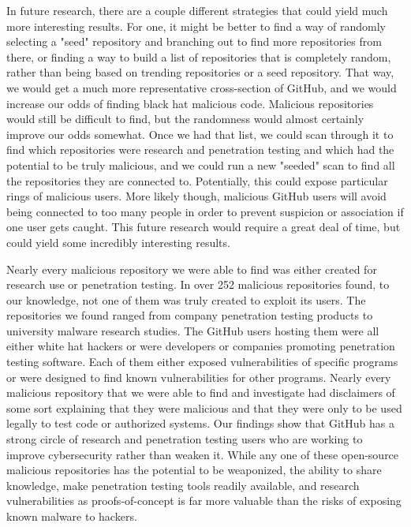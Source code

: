 \documentclass[]{acmart}
\begin{document}
In future research, there are a couple different strategies that could yield much more interesting results. For one, it might be better to find a way of randomly selecting a "seed" repository and branching out to find more repositories from there, or finding a way to build a list of repositories that is completely random, rather than being based on trending repositories or a seed repository. That way, we would get a much more representative cross-section of GitHub, and we would increase our odds of finding black hat malicious code. Malicious repositories would still be difficult to find, but the randomness would almost certainly improve our odds somewhat. Once we had that list, we could scan through it to find which repositories were research and penetration testing and which had the potential to be truly malicious, and we could run a new "seeded" scan to find all the repositories they are connected to. Potentially, this could expose particular rings of malicious users. More likely though, malicious GitHub users will avoid being connected to too many people in order to prevent suspicion or association if one user gets caught. This future research would require a great deal of time, but could yield some incredibly interesting results.

Nearly every malicious repository we were able to find was either created for research use or penetration testing. In over 252 malicious repositories found, to our knowledge, not one of them was truly created to exploit its users. The repositories we found ranged from company penetration testing products to university malware research studies. The GitHub users hosting them were all either white hat hackers or were developers or companies promoting penetration testing software. Each of them either exposed vulnerabilities of specific programs or were designed to find known vulnerabilities for other programs. Nearly every malicious repository that we were able to find and investigate had disclaimers of some sort explaining that they were malicious and that they were only to be used legally to test code or authorized systems. Our findings show that GitHub has a strong circle of research and penetration testing users who are working to improve cybersecurity rather than weaken it. While any one of these open-source malicious repositories has the potential to be weaponized, the ability to share knowledge, make penetration testing tools readily available, and research vulnerabilities as proofs-of-concept is far more valuable than the risks of exposing known malware to hackers.
\end{document}
